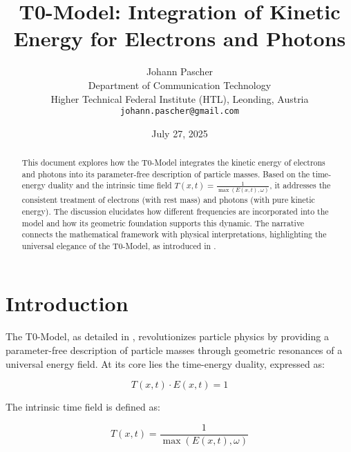 \documentclass[12pt,a4paper]{article}
\begin{document}
	
	\title{T0-Model: Integration of Kinetic Energy for Electrons and Photons}
	\author{Johann Pascher\\
		Department of Communication Technology\\
		Higher Technical Federal Institute (HTL), Leonding, Austria\\
		\texttt{johann.pascher@gmail.com}}
	\date{July 27, 2025}
	
	\maketitle
	
	\begin{abstract}
		This document explores how the T0-Model integrates the kinetic energy of electrons and photons into its parameter-free description of particle masses. Based on the time-energy duality and the intrinsic time field \( T(x,t) = \frac{1}{\max(E(x,t), \omega)} \), it addresses the consistent treatment of electrons (with rest mass) and photons (with pure kinetic energy). The discussion elucidates how different frequencies are incorporated into the model and how its geometric foundation supports this dynamic. The narrative connects the mathematical framework with physical interpretations, highlighting the universal elegance of the T0-Model, as introduced in \cite{pascher_t0_energy_2025}.
	\end{abstract}
	
	\tableofcontents
	\newpage
	
	\section{Introduction}
	\label{sec:introduction}
	
	The T0-Model, as detailed in \cite{pascher_t0_energy_2025}, revolutionizes particle physics by providing a parameter-free description of particle masses through geometric resonances of a universal energy field. At its core lies the time-energy duality, expressed as:
	
	\begin{equation}
		T(x,t) \cdot E(x,t) = 1
		\label{eq:time_energy_duality}
	\end{equation}
	
	The intrinsic time field is defined as:
	
	\begin{equation}
		T(x,t) = \frac{1}{\max(E(x,t), \omega)}
		\label{eq:intrinsic_time_field}
	\end{equation}
	
\end{document}
